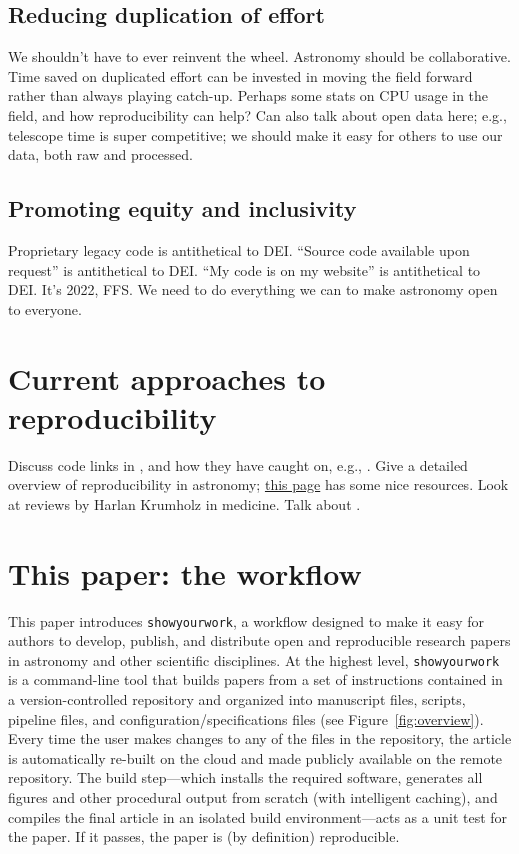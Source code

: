 \documentclass{aastex631}
\newcommand\xxx[1]{{\color{red}#1}}
\newcommand\syw{\texttt{showyourwork}\xspace}
\begin{document}
\subsection{Reducing duplication of effort}
\label{sec:args:duplication}
\xxx{We shouldn't have to ever reinvent the wheel. Astronomy should be collaborative. Time saved on duplicated effort can be invested in moving the field forward rather than always playing catch-up.}
%
\xxx{Perhaps some stats on CPU usage in the field, and how reproducibility can help?}
%
\xxx{Can also talk about open data here; e.g., telescope time is super competitive; we should make it easy for others to use our data, both raw and processed.}

\subsection{Promoting equity and inclusivity}
\label{sec:args:dei}
\xxx{Proprietary legacy code is antithetical to DEI. ``Source code available upon request'' is antithetical to DEI. ``My code is on my website'' is antithetical to DEI. It's 2022, FFS. We need to do everything we can to make astronomy open to everyone.}


\section{Current approaches to reproducibility}
\label{sec:intro:curr}
\xxx{Discuss code links in \citet{Luger2019,Luger2021a,Luger2021b}, and how they have caught on, e.g., \citet{Paillas2022}.} 
%
\xxx{Give a detailed overview of reproducibility in astronomy; \href{https://maneage.org/pdf/slides-intro.pdf}{this page} has some nice resources. Look at reviews by Harlan Krumholz in medicine. Talk about \maneage.}
%

\section{This paper: the \showyourwork workflow}
\label{sec:intro:syw}
This paper introduces \syw, a workflow designed to make it easy for authors to develop, publish, and distribute open and reproducible research papers in astronomy and other scientific disciplines. 
At the highest level, \syw is a command-line tool that builds papers from a set of instructions contained in a version-controlled repository and organized into manuscript files, scripts, pipeline files, and configuration/specifications files (see Figure~\ref{fig:overview}).
Every time the user makes changes to any of the files in the repository, the article is automatically re-built on the cloud and made publicly available on the remote repository.
The build step---which installs the required software, generates all figures and other procedural output from scratch (with intelligent caching), and compiles the final article in an isolated build environment---acts as a unit test for the paper. 
If it passes, the paper is (by definition) reproducible.
\end{document}
